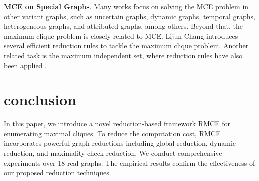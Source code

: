 \documentclass[sigconf, nonacm]{acmart}
\begin{document}
\noindent\textbf{MCE on Special Graphs}. 
Many works focus on solving the MCE problem in other variant graphs, such as uncertain graphs\cite{mukherjee2015mining,li2019improved,dai2022fast}, dynamic graphs\cite{sun2017mining,das2019incremental}, temporal graphs\cite{himmel2016enumerating,molter2021isolation}, heterogeneous graphs\cite{hu2019discovering}, and attributed graphs\cite{pan2022fairness,zhang2023fairness}, among others.
Beyond that, the maximum clique problem is closely related to MCE. Lijun Chang \cite{chang2019eff} introduces several efficient reduction rules to tackle the maximum clique problem. Another related task is the maximum independent set, where reduction rules have also been applied \cite{fomin2009measure,dahlum2016accelerating,chang2017computing}.

\vspace{-0.1in}
\section{conclusion} \label{sec9}

In this paper, we introduce a novel reduction-based framework RMCE for enumerating maximal cliques. To reduce the computation cost, RMCE incorporates powerful graph reductions including global reduction, dynamic reduction, and maximality check reduction. We conduct comprehensive experiments over 18 real graphs. The empirical results confirm %
the %
effectiveness of our proposed reduction techniques.



\balance



\end{document}
